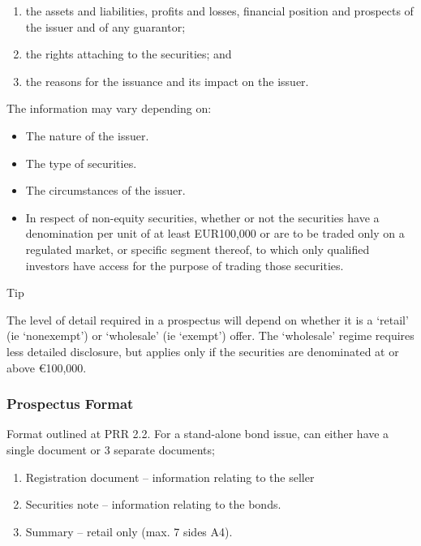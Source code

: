 \documentclass[
]{article}
\providecommand{\tightlist}{%
  \setlength{\itemsep}{0pt}\setlength{\parskip}{0pt}}
\newenvironment{env-100773c6-502e-49a1-b0f0-49a30dbf5b8e}
{
    \savenotes\tcolorbox[blanker,breakable,left=5pt,borderline west={2pt}{-4pt}{cyan}]
}
{
    \endtcolorbox\spewnotes
}
\begin{document}
\begin{enumerate}
\tightlist
\item
  the assets and liabilities, profits and losses, financial position and
  prospects of the issuer and of any guarantor;
\item
  the rights attaching to the securities; and
\item
  the reasons for the issuance and its impact on the issuer.
\end{enumerate}

The information may vary depending on:

\begin{itemize}
\tightlist
\item
  The nature of the issuer.
\item
  The type of securities.
\item
  The circumstances of the issuer.
\item
  In respect of non-equity securities, whether or not the securities
  have a denomination per unit of at least EUR100,000 or are to be
  traded only on a regulated market, or specific segment thereof, to
  which only qualified investors have access for the purpose of trading
  those securities.
\end{itemize}

\begin{env-100773c6-502e-49a1-b0f0-49a30dbf5b8e}

Tip

The level of detail required in a prospectus will depend on whether it
is a `retail' (ie `nonexempt') or `wholesale' (ie `exempt') offer. The
`wholesale' regime requires less detailed disclosure, but applies only
if the securities are denominated at or above €100,000.

\end{env-100773c6-502e-49a1-b0f0-49a30dbf5b8e}

\hypertarget{prospectus-format}{%
\subsubsection{Prospectus Format}\label{prospectus-format}}

Format outlined at PRR 2.2. For a stand-alone bond issue, can either
have a single document or 3 separate documents;

\begin{enumerate}
\tightlist
\item
  Registration document -- information relating to the seller
\item
  Securities note -- information relating to the bonds.
\item
  Summary -- retail only (max. 7 sides A4).
\end{enumerate}
\end{document}
